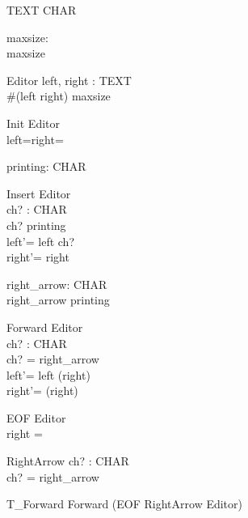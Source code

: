 \documentclass{llncs}
\begin{document}
\begin{zed}
[CHAR]
\end{zed}
\begin{zed}
TEXT  \seq CHAR
\end{zed}
\begin{axdef}
maxsize: \nat\\
\ST maxsize 
\end{axdef}
\begin{schema}{Editor}
left, right : TEXT\\
\ST \#(left \cat right) \leq maxsize
\end{schema}
\begin{schema}{Init}
Editor\\
\ST left=right=\langle \rangle
\end{schema}
\begin{axdef}
printing: \power CHAR
\end{axdef}
\begin{schema}{Insert}
\Delta Editor \\
ch? : CHAR\\
\ST ch? \in printing \\
left'= left \cat \langle ch? \rangle\\
right'= right
\end{schema}
\begin{axdef}
right\_arrow: CHAR \\
\ST right\_arrow \notin printing
\end{axdef}
\begin{schema}{Forward}
\Delta Editor \\
ch? : CHAR \\
\ST ch? = right\_arrow \\
left'= left \cat \langle \head (right) \rangle \\
right'= \tail (right)
\end{schema}
\begin{schema}{EOF}
Editor \\
\ST right = \langle \rangle
\end{schema}
\begin{schema}{RightArrow}
ch? : CHAR \\
\ST ch? = right\_arrow
\end{schema}
\begin{zed}
T\_Forward \sdef Forward \lor (EOF \land RightArrow \land \Xi
Editor)
\end{zed}
\end{document}
